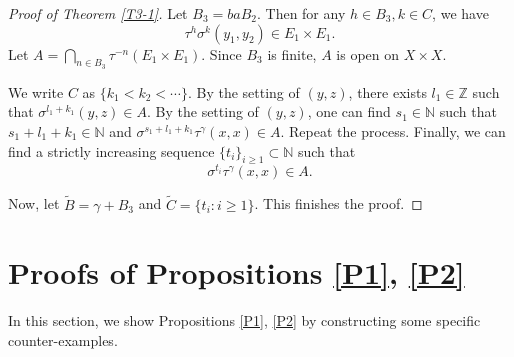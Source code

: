 \documentclass[reqno,12pt]{amsart}
\def \N {\mathbb N}
\def \Z {\mathbb Z}
\numberwithin{equation}{section}
\begin{document}
\begin{proof}[Proof of Theorem \ref{T3-1}]
		Let $B_3=baB_2$. Then for any $h\in B_3,k\in C$, we have $$\tau^{h}\sigma^{k}(y_1,y_2)\in E_1\times E_1.$$ Let $A=\bigcap_{n\in B_3}\tau^{-n}(E_1\times E_1)$. Since $B_3$ is finite, $A$ is open on $X\times X$.
		
		We write $C$ as $\{k_1<k_2<\cdots\}$. By the setting of $(y,z)$,
		there exists $l_1\in \Z$ such that $\sigma^{l_1+k_1}(y,z)\in A$. By the setting of $(y,z)$, one can find $s_1\in \N$ such that $s_1+l_1+k_1\in \N$ and $\sigma^{s_1+l_1+k_1}\tau^{\gamma}(x,x)\in A$. Repeat the process. Finally, we can find
		  a strictly increasing sequence $\{t_i\}_{i\ge 1}\subset \N$ such that $$\sigma^{t_i}\tau^{\gamma}(x,x)\in A.$$
		
		Now, let $\tilde{B}=\gamma+B_3$ and $\tilde{C}=\{t_i:i\ge 1\}$. This finishes the proof.
	\end{proof}

\section{Proofs of Propositions \ref{P1}, \ref{P2}}\label{SC}
In this section, we show Propositions \ref{P1}, \ref{P2} by constructing some specific counter-examples.
\end{document}
